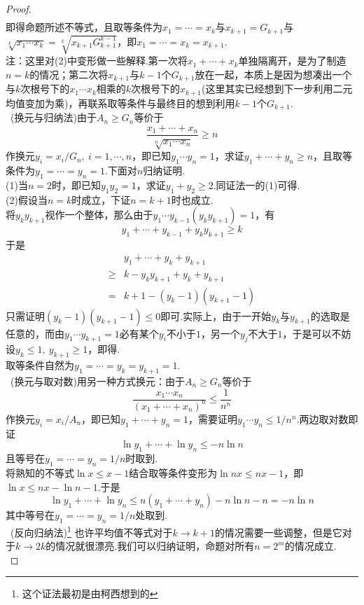 \documentclass[lang=cn, zihao=5]{elegantbook}
\newcommand{\pw}[1]{\boxed{\text{证法 #1}} \ }
\begin{document}
\begin{proof}
\begin{align*}
	\end{align*}
	即得命题所述不等式，且取等条件为$x_1= \cdots = x_k$与$x_{k+1}=G_{k+1}$与$\sqrt[k]{x_1 \cdots x_k} = \sqrt[k]{x_{k+1}G_{k+1}^{k-1}}$，即$x_1 = \cdots = x_k = x_{k+1}$. \\ 
	注：这里对(2)中变形做一些解释.第一次将$x_1 + \cdots + x_k$单独隔离开，是为了制造$n=k$的情况；第二次将$x_{k+1}$与$k-1$个$G_{k+1}$放在一起，本质上是因为想凑出一个与$k$次根号下的$x_1 \cdots x_k$相乘的$k$次根号下的$x_{k+1}$(这里其实已经想到下一步利用二元均值变加为乘)，再联系取等条件与最终目的想到利用$k-1$个$G_{k+1}$. \\
	\pw{二}(换元与归纳法)由于$A_n \geq G_n$等价于$$\frac{x_1+\cdots +x_n}{\sqrt[n]{x_1 \cdots x_n}} \geq n$$
	作换元$y_i = x_i/G_n,~i=1,\cdots ,n$，即已知$y_1 \cdots y_n = 1$，求证$y_1 + \cdots + y_n \geq n$，且取等条件为$y_1 = \cdots = y_n = 1$.下面对$n$归纳证明. \\
	(1)当$n=2$时，即已知$y_1y_2=1$，求证$y_1+y_2 \geq 2$.同证法一的(1)可得. \\
	(2)假设当$n=k$时成立，下证$n=k+1$时也成立. \\
	将$y_ky_{k+1}$视作一个整体，那么由于$y_1 \cdots y_{k-1}(y_ky_{k+1}) = 1$，有$$y_1 + \cdots + y_{k-1} + y_ky_{k+1} \geq k$$
	于是
	\begin{align*}
		&y_1 + \cdots + y_k + y_{k+1} \\
		\geq & k- y_ky_{k+1} + y_k + y_{k+1} \\
		=& k+1 - (y_k-1)(y_{k+1}-1)
	\end{align*}
	只需证明$(y_k-1)(y_{k+1}-1) \leq 0$即可.实际上，由于一开始$y_k$与$y_{k+1}$的选取是任意的，而由$y_1 \cdots y_{k+1}=1$必有某个$y_i$不小于$1$，另一个$y_j$不大于$1$，于是可以不妨设$y_k \leq 1,~y_{k+1} \geq 1$，即得. \\
	取等条件自然为$y_1 = \cdots =y_k = y_{k+1} = 1$. \\
	\pw{三}(换元与取对数)用另一种方式换元：由于$A_n \geq G_n$等价于$$\frac{x_1 \cdots x_n}{(x_1+ \cdots +x_n)^n} \leq \frac{1}{n^n}$$
	作换元$y_i=x_i/A_n$，即已知$y_1 + \cdots + y_n = 1$，需要证明$y_1 \cdots y_n \leq 1/n^n$.两边取对数即证$$\ln y_1 + \cdots + \ln y_n \leq -n\ln n$$
	且等号在$y_1 = \cdots =y_n = 1/n$时取到. \\
	将熟知的不等式$\ln x \leq x-1$结合取等条件变形为$\ln nx \leq nx-1$，即$\ln x \leq nx-\ln n -1$.于是$$\ln y_1 + \cdots + \ln y_n \leq n(y_1 + \cdots +y_n) - n\ln n - n = -n \ln n$$
	其中等号在$y_1 = \cdots = y_n = 1/n$处取到. \\
	\pw{四}(反向归纳法)\footnote{这个证法最初是由柯西想到的} 也许平均值不等式对于$k \to k+1$的情况需要一些调整，但是它对于$k \to 2k$的情况就很漂亮.我们可以归纳证明，命题对所有$n=2^m$的情况成立. \\

\end{proof}
\end{document}
